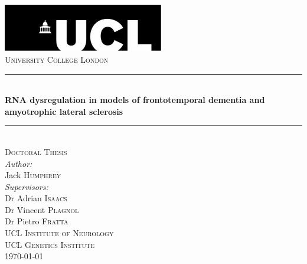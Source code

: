 \documentclass[a4paper,11pt,twoside]{report}
\begin{document}
\setcounter{page}{7}

\begin{titlepage}%
\newcommand{\HRule}{\rule{\linewidth}{0.5mm}}

\center 

\includegraphics[width=7cm]{Figures/misc/ucllogo.jpg}\\[1cm]
\textsc{\LARGE University College London}\\[2cm] %
\HRule \\[1cm]
{ \huge \bfseries RNA dysregulation in models of frontotemporal dementia and amyotrophic lateral sclerosis}\\[0.4cm] 
\HRule \\[1.5cm]


\textsc{\Large Doctoral Thesis}\\[1.5cm] %


\emph{Author:}\\
Jack \textsc{Humphrey}\\[1cm] %

\emph{Supervisors:} \\
Dr Adrian \textsc{Isaacs}\\ 
Dr Vincent \textsc{Plagnol}\\ 
Dr Pietro \textsc{Fratta}\\[1cm]


\textsc{\Large UCL Institute of Neurology}\\[0.5cm] %
\textsc{\Large UCL Genetics Institute}\\[2cm] %



{\large \today}\\[3cm] 

\vfill %

\end{titlepage}%
\cleardoublepage
\end{document}
